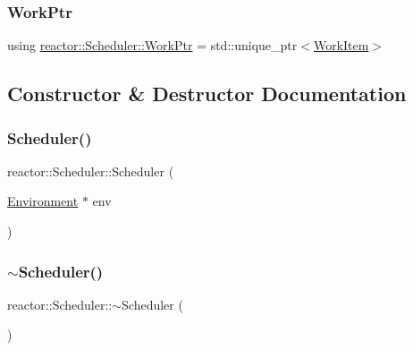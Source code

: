\mbox{\label{classreactor_1_1Scheduler_a4a4934dc58f294069b8c64435cdfe564}} 
\subsubsection{\texorpdfstring{Work\+Ptr}{WorkPtr}}
{\footnotesize\ttfamily using \hyperlink{classreactor_1_1Scheduler_a4a4934dc58f294069b8c64435cdfe564}{reactor\+::\+Scheduler\+::\+Work\+Ptr} =  std\+::unique\+\_\+ptr$<$\hyperlink{classreactor_1_1Scheduler_a5a4a25635fcb20f268876a0bf70eb68e}{Work\+Item}$>$}



\subsection{Constructor \& Destructor Documentation}
\mbox{\label{classreactor_1_1Scheduler_a58fbbd0e02d4fc8ef0bcf9330d010c2e}} 
\subsubsection{\texorpdfstring{Scheduler()}{Scheduler()}}
{\footnotesize\ttfamily reactor\+::\+Scheduler\+::\+Scheduler (\begin{DoxyParamCaption}\item[{\hyperlink{classreactor_1_1Environment}{Environment} $\ast$}]{env }\end{DoxyParamCaption})}

\mbox{\label{classreactor_1_1Scheduler_ad6f0cfcd7f07fa81392ab62f172fbd68}} 
\subsubsection{\texorpdfstring{$\sim$\+Scheduler()}{~Scheduler()}}
{\footnotesize\ttfamily reactor\+::\+Scheduler\+::$\sim$\+Scheduler (\begin{DoxyParamCaption}{ }\end{DoxyParamCaption})}



